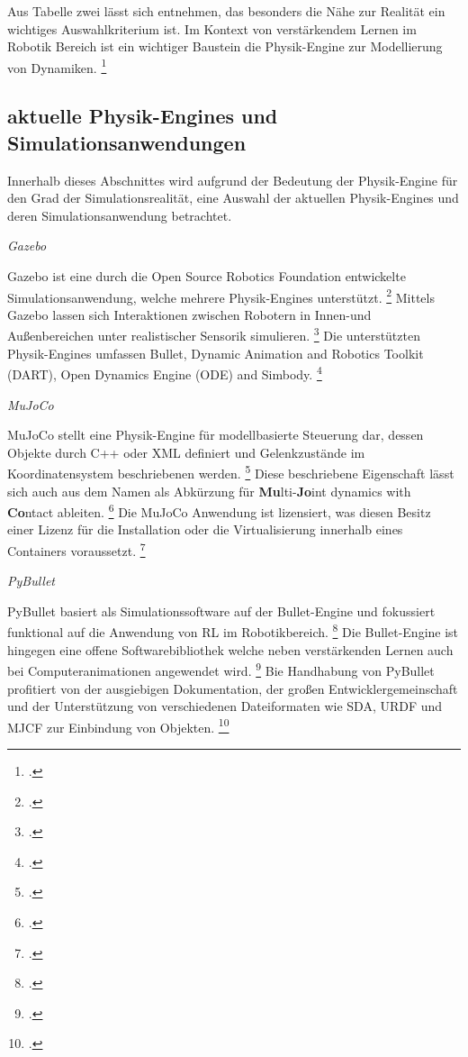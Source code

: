 Aus Tabelle zwei lässt sich entnehmen, das besonders die Nähe zur Realität ein wichtiges Auswahlkriterium ist.
Im Kontext von verstärkendem Lernen im Robotik Bereich ist ein wichtiger Baustein die Physik-Engine zur Modellierung von Dynamiken. \footcite[Vgl.][S. 2]{Ayala.2020}

\subsection{aktuelle Physik-Engines und Simulationsanwendungen}
Innerhalb dieses Abschnittes wird aufgrund der Bedeutung der Physik-Engine für den Grad der Simulationsrealität, eine Auswahl der aktuellen Physik-Engines und deren Simulationsanwendung betrachtet.

\textit{Gazebo}

Gazebo ist eine durch die Open Source Robotics Foundation entwickelte Simulationsanwendung, welche mehrere Physik-Engines unterstützt. \footcite[Vgl.][S. 7]{Ivaldi.2272014}
Mittels Gazebo lassen sich Interaktionen zwischen Robotern in Innen-und Außenbereichen unter realistischer Sensorik simulieren. \footcite[Vgl.][S. 4]{Ayala.2020}
Die unterstützten Physik-Engines umfassen Bullet, Dynamic Animation and Robotics Toolkit (DART), Open Dynamics Engine (ODE) and Simbody. \footcite[Vgl.][S. 3]{Korber.2021}

\textit{MuJoCo}

MuJoCo stellt eine Physik-Engine für modellbasierte Steuerung dar, dessen Objekte durch C++ oder XML definiert und Gelenkzustände im Koordinatensystem beschriebenen werden. \footcite[Vgl.][S. 1]{Todorov.2012} 
Diese beschriebene Eigenschaft lässt sich auch aus dem Namen als Abkürzung für \textbf{Mu}lti-\textbf{Jo}int dynamics with \textbf{Co}ntact ableiten. \footcite[Vgl.][S. 2]{Todorov.2012}
Die MuJoCo Anwendung ist lizensiert, was diesen Besitz einer Lizenz für die Installation oder die Virtualisierung innerhalb eines Containers voraussetzt. \footcite[Vgl.][S. 3]{Korber.2021}

\textit{PyBullet}

PyBullet basiert als Simulationssoftware auf der Bullet-Engine und fokussiert funktional auf die Anwendung von RL im Robotikbereich. \footcite[Vgl.][S. 3]{Korber.2021}
Die Bullet-Engine ist hingegen eine offene Softwarebibliothek welche neben verstärkenden Lernen auch bei Computeranimationen angewendet wird. \footcite[Vgl.][S. 7]{Ivaldi.2272014}
Bie Handhabung von PyBullet profitiert von der ausgiebigen Dokumentation, der großen Entwicklergemeinschaft und der Unterstützung von verschiedenen Dateiformaten wie SDA, URDF und MJCF zur Einbindung von Objekten. \footcite[Vgl.][S. 6]{Korber.2021}